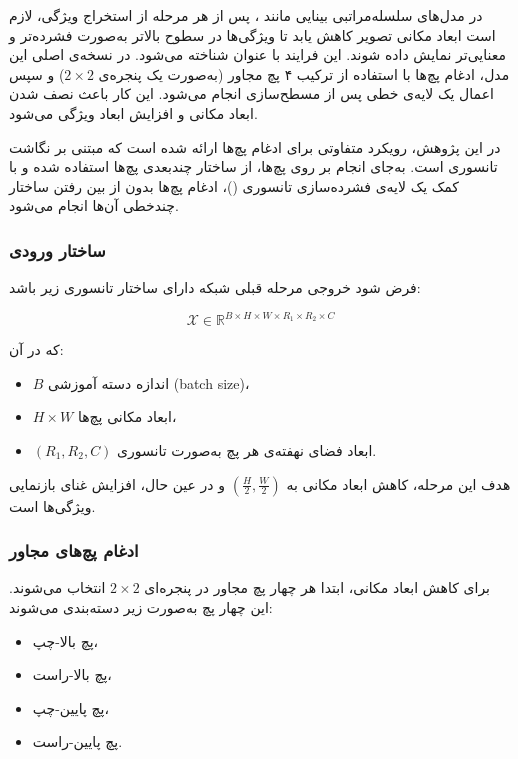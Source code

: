 در مدل‌های سلسله‌مراتبی بینایی مانند ، پس از هر مرحله از استخراج ویژگی، لازم است ابعاد مکانی تصویر کاهش یابد تا ویژگی‌ها در سطوح بالاتر به‌صورت فشرده‌تر و معنایی‌تر نمایش داده شوند. این فرایند با عنوان  شناخته می‌شود. در نسخه‌ی اصلی این مدل، ادغام پچ‌ها با استفاده از ترکیب ۴ پچ مجاور (به‌صورت یک پنجره‌ی $2 \times 2$) و سپس اعمال یک لایه‌ی خطی پس از مسطح‌سازی انجام می‌شود. این کار باعث نصف شدن ابعاد مکانی و افزایش ابعاد ویژگی می‌شود.

در این پژوهش، رویکرد متفاوتی برای ادغام پچ‌ها ارائه شده است که مبتنی بر نگاشت تانسوری است. به‌جای انجام  بر روی پچ‌ها، از ساختار چندبعدی پچ‌ها استفاده شده و با کمک یک لایه‌ی فشرده‌سازی تانسوری ()، ادغام پچ‌ها بدون از بین رفتن ساختار چندخطی آن‌ها انجام می‌شود.

\subsubsection*{ساختار ورودی}

فرض شود خروجی مرحله قبلی شبکه دارای ساختار تانسوری زیر باشد:

\[
\mathcal{X} \in \mathbb{R}^{B \times H \times W \times R_1 \times R_2 \times C}
\]

که در آن:

\begin{itemize}
	\item $B$ اندازه دسته آموزشی (batch size)،  
	\item $H \times W$ ابعاد مکانی پچ‌ها،  
	\item $(R_1, R_2, C)$ ابعاد فضای نهفته‌ی هر پچ به‌صورت تانسوری.
\end{itemize}

هدف این مرحله، کاهش ابعاد مکانی به $\left( \frac{H}{2}, \frac{W}{2} \right)$ و در عین حال، افزایش غنای بازنمایی ویژگی‌ها است.

\subsubsection*{ادغام پچ‌های مجاور}

برای کاهش ابعاد مکانی، ابتدا هر چهار پچ مجاور در پنجره‌ای $2 \times 2$ انتخاب می‌شوند. این چهار پچ به‌صورت زیر دسته‌بندی می‌شوند:

\begin{itemize}
	\item پچ بالا-چپ،
	\item پچ بالا-راست،
	\item پچ پایین-چپ،
	\item پچ پایین-راست.
\end{itemize}

